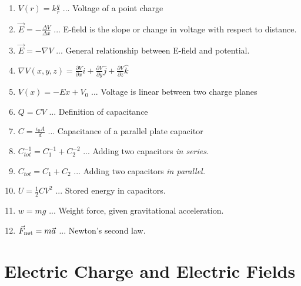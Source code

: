 \documentclass[10pt]{article}
\begin{document}
\begin{enumerate}
\item $V(r) = k\frac{q}{r}$ ... Voltage of a point charge
\item $\vec{E} = -\frac{\Delta V}{\Delta x}$ ... E-field is the slope or change in voltage with respect to distance.
\item $\vec{E} = -\nabla V$ ... General relationship between E-field and potential.
\item $\nabla V(x,y,z) = \frac{\partial V}{\partial x}\hat{i} + \frac{\partial V}{\partial y}\hat{j} + \frac{\partial V}{\partial z}\hat{k}$
\item $V(x) = -E x + V_0$ ... Voltage is linear between two charge planes
\item $Q = CV$ ... Definition of capacitance
\item $C = \frac{\epsilon_0 A}{d}$ ... Capacitance of a parallel plate capacitor
\item $C_{tot}^{-1} = C_1^{-1} + C_2^{-2}$ ... Adding two capacitors \textit{in series.}
\item $C_{tot} = C_1 + C_2$ ... Adding two capacitors \textit{in parallel.}
\item $U = \frac{1}{2}CV^2$ ... Stored energy in capacitors.
\item $w = mg$ ... Weight force, given gravitational acceleration.
\item $\vec{F}_{\rm net} = m\vec{a}$ ... Newton's second law.
\end{enumerate}

\clearpage

\section{Electric Charge and Electric Fields}
\end{document}
